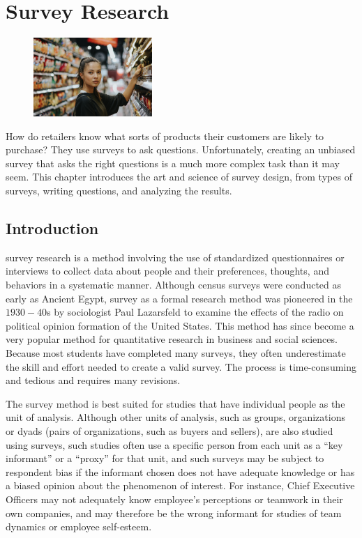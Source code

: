 \chapter{Survey Research}\label{08:surveys}

\begin{figure}
	\label{08:fig01} 
	\centering
	\includegraphics[width=0.4\textwidth]{gfx/08-01} 
\end{figure}

How do retailers know what sorts of products their customers are likely to purchase? They use surveys to ask questions. Unfortunately, creating an unbiased survey that asks the right questions is a much more complex task than it may seem. This chapter introduces the art and science of survey design, from types of surveys, writing questions, and analyzing the results.

\section{Introduction}

\Gls{survey} research is a method involving the use of standardized questionnaires or interviews to collect data about people and their preferences, thoughts, and behaviors in a systematic manner. Although census surveys were conducted as early as Ancient Egypt, survey as a formal research method was pioneered in the $ 1930-40 $s by sociologist Paul Lazarsfeld to examine the effects of the radio on political opinion formation of the United States. This method has since become a very popular method for quantitative research in business and social sciences. Because most students have completed many surveys, they often underestimate the skill and effort needed to create a valid survey. The process is time-consuming and tedious and requires many revisions.

The survey method is best suited for studies that have individual people as the unit of analysis. Although other units of analysis, such as groups, organizations or dyads (pairs of organizations, such as buyers and sellers), are also studied using surveys, such studies often use a specific person from each unit as a ``key informant'' or a ``proxy'' for that unit, and such surveys may be subject to respondent \gls{bias} if the informant chosen does not have adequate knowledge or has a biased opinion about the phenomenon of interest. For instance, Chief Executive Officers may not adequately know employee's perceptions or teamwork in their own companies, and may therefore be the wrong informant for studies of team dynamics or employee self-esteem.

